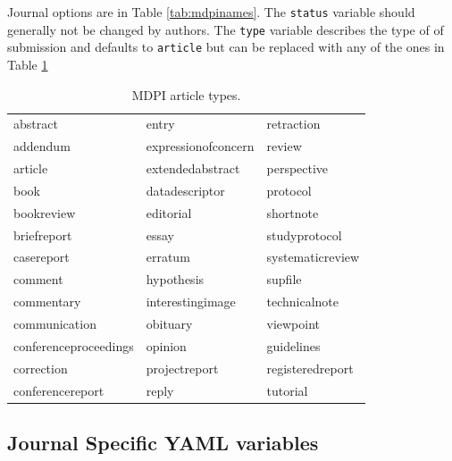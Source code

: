 \documentclass[notspecified,article,submit,moreauthors,pdftex]{Definitions/mdpi}
\begin{document}
Journal options are in Table \ref{tab:mdpinames}. The \texttt{status}
variable should generally not be changed by authors. The \texttt{type}
variable describes the type of of submission and defaults to
\texttt{article} but can be replaced with any of the ones in Table
\ref{tab:mdpitype}

\begin{table}

\caption{\label{tab:mdpitype}MDPI article types.}
\centering
\begin{tabular}[t]{lll}
\toprule
abstract & entry & retraction\\
addendum & expressionofconcern & review\\
article & extendedabstract & perspective\\
book & datadescriptor & protocol\\
bookreview & editorial & shortnote\\
\addlinespace
briefreport & essay & studyprotocol\\
casereport & erratum & systematicreview\\
comment & hypothesis & supfile\\
commentary & interestingimage & technicalnote\\
communication & obituary & viewpoint\\
\addlinespace
conferenceproceedings & opinion & guidelines\\
correction & projectreport & registeredreport\\
conferencereport & reply & tutorial\\
\bottomrule
\end{tabular}
\end{table}

\subsection{Journal Specific YAML
variables}\label{journal-specific-yaml-variables}
\end{document}
